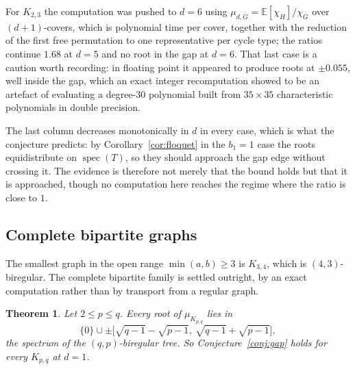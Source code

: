 \documentclass[11pt]{article}
\newtheorem{theorem}{Theorem}
\theoremstyle{remark}
\newcommand{\E}{\mathbb{E}}
\begin{document}
For $K_{2,3}$ the computation was pushed to $d=6$ using
$\mu_{d,G}=\E[\chi_H]/\chi_G$ over $(d+1)$-covers, which is polynomial time per
cover, together with the reduction of the first free permutation to one
representative per cycle type; the ratios continue
$1.68$ at $d=5$ and no root in the gap at $d=6$. That last case is a caution
worth recording: in floating point it appeared to produce roots at
$\pm0.055$, well inside the gap, which an exact integer recomputation showed to
be an artefact of evaluating a degree-$30$ polynomial built from $35\times35$
characteristic polynomials in double precision.

 The last column decreases monotonically in $d$ in
every case, which is what the conjecture predicts: by
Corollary~\ref{cor:floquet} in the $b_1=1$ case the roots equidistribute on
$\operatorname{spec}(T)$, so they should approach the gap edge without crossing
it. The evidence is therefore not merely that the bound holds but that it is
approached, though no computation here reaches the regime where the ratio is
close to $1$.

\subsection{Complete bipartite graphs}\label{sec:kpq}

The smallest graph in the open range $\min(a,b)\ge3$ is $K_{3,4}$, which is
$(4,3)$-biregular. The complete bipartite family is settled outright, by an exact
computation rather than by transport from a regular graph.

\begin{theorem}\label{thm:kpq}
Let $2\le p\le q$. Every root of $\mu_{K_{p,q}}$ lies in
\[
\{0\}\cup\pm\bigl[\sqrt{q-1}-\sqrt{p-1},\ \sqrt{q-1}+\sqrt{p-1}\bigr],
\]
the spectrum of the $(q,p)$-biregular tree. So Conjecture~\ref{conj:gap} holds for
every $K_{p,q}$ at $d=1$.
\end{theorem}
\end{document}
